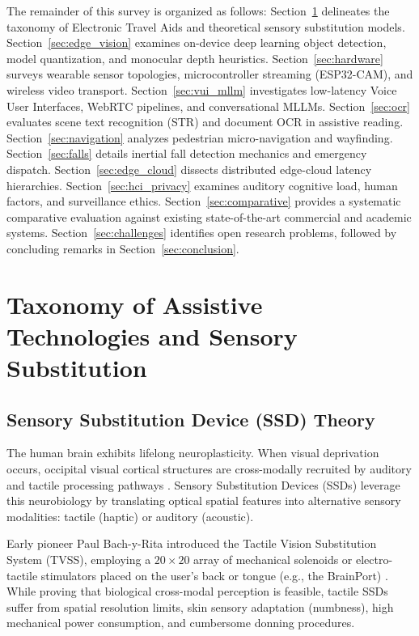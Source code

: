 \documentclass[10pt,twocolumn]{article}
\begin{document}
The remainder of this survey is organized as follows:
Section~\ref{sec:taxonomy} delineates the taxonomy of Electronic Travel Aids and theoretical sensory substitution models. 
Section~\ref{sec:edge_vision} examines on-device deep learning object detection, model quantization, and monocular depth heuristics. 
Section~\ref{sec:hardware} surveys wearable sensor topologies, microcontroller streaming (ESP32-CAM), and wireless video transport. 
Section~\ref{sec:vui_mllm} investigates low-latency Voice User Interfaces, WebRTC pipelines, and conversational MLLMs. 
Section~\ref{sec:ocr} evaluates scene text recognition (STR) and document OCR in assistive reading. 
Section~\ref{sec:navigation} analyzes pedestrian micro-navigation and wayfinding. 
Section~\ref{sec:falls} details inertial fall detection mechanics and emergency dispatch. 
Section~\ref{sec:edge_cloud} dissects distributed edge-cloud latency hierarchies. 
Section~\ref{sec:hci_privacy} examines auditory cognitive load, human factors, and surveillance ethics. 
Section~\ref{sec:comparative} provides a systematic comparative evaluation against existing state-of-the-art commercial and academic systems. 
Section~\ref{sec:challenges} identifies open research problems, followed by concluding remarks in Section~\ref{sec:conclusion}.

\section{Taxonomy of Assistive Technologies and Sensory Substitution}
\label{sec:taxonomy}

\subsection{Sensory Substitution Device (SSD) Theory}
The human brain exhibits lifelong neuroplasticity. When visual deprivation occurs, occipital visual cortical structures are cross-modally recruited by auditory and tactile processing pathways \cite{bach1969sensory, merabet2010neuroplastic}. Sensory Substitution Devices (SSDs) leverage this neurobiology by translating optical spatial features into alternative sensory modalities: tactile (haptic) or auditory (acoustic).

Early pioneer Paul Bach-y-Rita introduced the Tactile Vision Substitution System (TVSS), employing a $20 \times 20$ array of mechanical solenoids or electro-tactile stimulators placed on the user's back or tongue (e.g., the BrainPort) \cite{bach1969sensory, bach2004see}. While proving that biological cross-modal perception is feasible, tactile SSDs suffer from spatial resolution limits, skin sensory adaptation (numbness), high mechanical power consumption, and cumbersome donning procedures.
\end{document}
